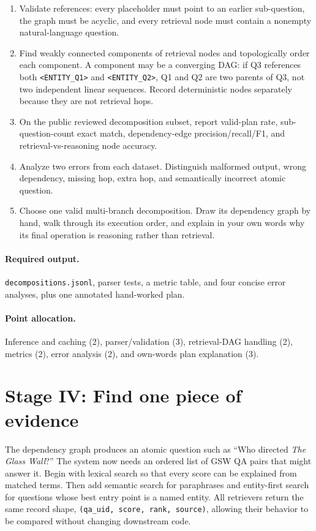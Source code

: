 \documentclass[11pt]{article}
\newcommand{\code}[1]{\texttt{#1}}
\newcommand{\deliverables}{\paragraph{Required output.}}
\newcommand{\grading}{\paragraph{Point allocation.}}
\begin{document}
\begin{enumerate}[label=(\alph*)]
  \item Validate references: every placeholder must point to an earlier
        sub-question, the graph must be acyclic, and every retrieval node must
        contain a nonempty natural-language question.
  \item Find weakly connected components of retrieval nodes and topologically
        order each component. A component may be a converging DAG: if Q3
        references both \code{<ENTITY\_Q1>} and \code{<ENTITY\_Q2>}, Q1 and Q2
        are two parents of Q3, not two independent linear sequences. Record
        deterministic nodes separately because they are not retrieval hops.
  \item On the public reviewed decomposition subset, report valid-plan rate,
        sub-question-count exact match, dependency-edge precision/recall/F1,
        and retrieval-vs-reasoning node accuracy.
  \item Analyze two errors from each dataset. Distinguish malformed output,
        wrong dependency, missing hop, extra hop, and semantically incorrect
        atomic question.
  \item Choose one valid multi-branch decomposition. Draw its dependency graph
        by hand, walk through its execution order, and explain in your own
        words why its final operation is reasoning rather than retrieval.
\end{enumerate}

\deliverables \code{decompositions.jsonl}, parser tests, a metric table, and
four concise error analyses, plus one annotated hand-worked plan.

\grading Inference and caching (2), parser/validation (3), retrieval-DAG
handling (2), metrics (2), error analysis (2), and own-words plan explanation
(3).

\section{Stage IV: Find one piece of evidence}

The dependency graph produces an atomic question such as ``Who directed
\emph{The Glass Wall}?'' The system now needs an ordered list of GSW QA pairs
that might answer it. Begin with lexical search so that every score can be
explained from matched terms. Then add semantic search for paraphrases and
entity-first search for questions whose best entry point is a named entity.
All retrievers return the same record shape,
\code{(qa\_uid, score, rank, source)}, allowing their behavior to be compared
without changing downstream code.
\end{document}
